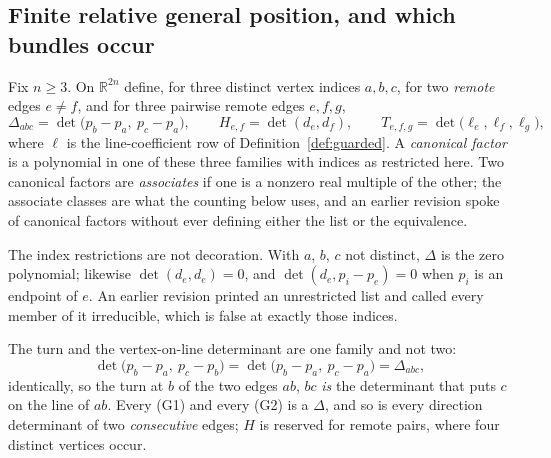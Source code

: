 \subsection{Finite relative general position, and which bundles occur}

\begin{lemma}\label{lem:relgp}
Fix $n\geq3$.
On $\mathbb R^{2n}$ define, for three distinct vertex indices $a,b,c$, for two
\emph{remote} edges $e\neq f$, and for three pairwise remote edges $e,f,g$,
\[
   \Delta_{abc}=\det\bigl(p_b-p_a,\ p_c-p_a\bigr),\qquad
   H_{e,f}=\det(d_e,d_f),\qquad
   T_{e,f,g}=\det\bigl(\ell_e,\ell_f,\ell_g\bigr),
\]
where $\ell$ is the line-coefficient row of Definition~\ref{def:guarded}. A
\emph{canonical factor} is a polynomial in one of these three families with
indices as restricted here. Two canonical factors are \emph{associates} if one
is a nonzero real multiple of the other; the associate classes are what the
counting below uses, and an earlier revision spoke of canonical factors without
ever defining either the list or the equivalence.

The index restrictions are not decoration. With $a$, $b$, $c$ not distinct,
$\Delta$ is the zero polynomial; likewise $\det(d_e,d_e)=0$, and
$\det(d_e,p_i-p_e)=0$ when $p_i$ is an endpoint of $e$. An earlier revision
printed an unrestricted list and called every member of it irreducible, which
is false at exactly those indices.

The turn and the vertex-on-line determinant are one family and not two:
\[
   \det\bigl(p_b-p_a,\ p_c-p_b\bigr)=\det\bigl(p_b-p_a,\ p_c-p_a\bigr)
   =\Delta_{abc},
\]
identically, so the turn at $b$ of the two edges $ab$, $bc$ \emph{is} the
determinant that puts $c$ on the line of $ab$. Every (G1) and every (G2) is a
$\Delta$, and so is every direction determinant of two \emph{consecutive}
edges; $H$ is reserved for remote pairs, where four distinct vertices occur.


\end{lemma}
